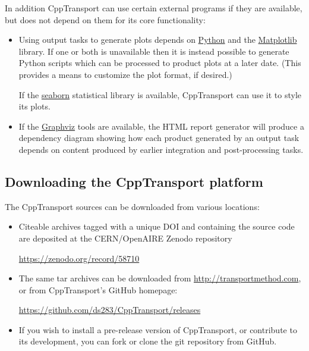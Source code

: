 \documentclass[11pt,a4paper]{article}
\newcommand{\packagefont}{\sffamily}
\newcommand{\CppTransport}{{\packagefont CppTransport}}
\newcommand{\Python}{{\packagefont Python}}
\newcommand{\Matplotlib}{{\packagefont Matplotlib}}
\newcommand{\seaborn}{{\packagefont seaborn}}
\newcommand{\Graphviz}{{\packagefont Graphviz}}
\begin{document}
In addition {\CppTransport} can use certain external programs
if they are available, but does not depend on them for its
core functionality:
\begin{itemize}
    \item Using output tasks to generate plots
    depends on \href{https://www.python.org}{\Python} and the
    \href{http://matplotlib.org}{\Matplotlib} library.
    If one or both is unavailable then it is instead possible
    to generate Python scripts which can be processed to
    product plots at a later date.
    (This provides a means to customize the plot format, if desired.)
    
    If the
    \href{https://stanford.edu/~mwaskom/software/seaborn}{\seaborn}
    statistical library is available, {\CppTransport} can use
    it to style its plots.
    
    \item If the \href{http://www.graphviz.org}{\Graphviz} tools are
    available, the HTML report generator will produce a dependency diagram
    showing how each product generated by an output task
    depends on content produced by earlier integration and
    post-processing tasks.
\end{itemize}

\subsection{Downloading the {\CppTransport} platform}
\label{sec:downloading}

The {\CppTransport} sources can be downloaded from various locations:
\begin{itemize}
    \item Citeable archives tagged with a unique
    DOI and containing the source code are deposited
    at the CERN/OpenAIRE Zenodo repository
    \begin{center}
        \url{https://zenodo.org/record/58710}    
    \end{center}

    \item The same tar archives can be downloaded from
    \url{http://transportmethod.com}, or
    from {\CppTransport}'s GitHub homepage:
    \begin{center}
        \url{https://github.com/ds283/CppTransport/releases}    
    \end{center}    
    
    \item If you wish to install a pre-release version of {\CppTransport},
    or contribute to its development, you can fork or clone the
    git repository from GitHub. 
\end{itemize}
\end{document}
